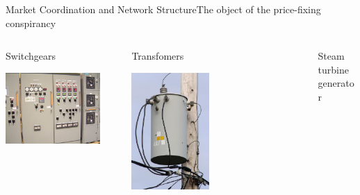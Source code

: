 \documentclass[notes, aspectratio=1610]{beamer}
\begin{document}
\begin{frame}{Market Coordination and Network Structure}{The object of the price-fixing conspirancy}
	\begin{columns}
		\begin{column}{0.33\textwidth}
			\centering 
			Switchgears

			\includegraphics[width=0.85\textwidth]{images/switchgear}
		\end{column}
		\begin{column}{0.33\textwidth}
			\centering 
			Transfomers

			\includegraphics[width=0.45\textwidth]{images/transformer.jpeg}
		\end{column}
		\begin{column}{0.33\textwidth}
			\centering 
			Steam turbine generator


\end{column}
\end{columns}
\end{frame}
\end{document}
